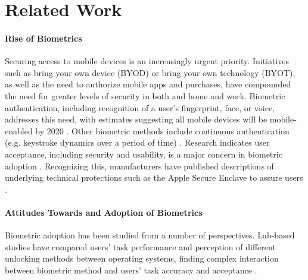 \section{Related Work}

\paragraph{Rise of Biometrics}
Securing access to mobile devices is an increasingly urgent priority. %
Initiatives such as bring your own device (BYOD) or bring your own technology (BYOT), as well as the need to authorize mobile apps and purchases, have compounded the need for greater levels of security in both and home and work. Biometric authentication, including recognition of a user's fingerprint, face, or voice, addresses this need, with estimates suggesting all mobile devices will be mobile-enabled by 2020 \cite{biometricsupdate}. %
Other biometric methods include continuous authentication (e.g. keystroke dynamics over a period of time) \cite{meng2015surveying}. %
Research indicates user acceptance, including security and usability, is a major concern in biometric adoption \cite{rashed2015towards}. Recognizing this, manufacturers have published descriptions of underlying technical protections such as the Apple Secure Enclave to assure users \cite{iOS_security}. %

\paragraph{Attitudes Towards and Adoption of Biometrics}
Biometric adoption has been studied from a number of perspectives. Lab-based studies have compared users' task performance and perception of different unlocking methods between operating systems, finding complex interaction between biometric method and users' task accuracy and acceptance \cite{bhagavatula2015biometric,trewin2012biometric}. 

